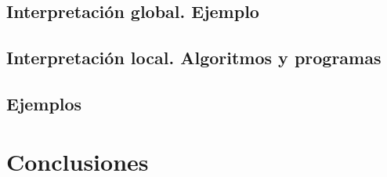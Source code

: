 \documentclass[12pt, a4paper, twoside]{book}
\numberwithin{equation}{section}
\theoremstyle{definition}
\theoremstyle{remark}
\theoremstyle{plain}
\begin{document}
	\section{Interpretación global. Ejemplo}

	\section{Interpretación local. Algoritmos y programas}

	\section{Ejemplos}

	\chapter{Conclusiones}

	\newpage
	\nocite{*}
	
	
\end{document}
